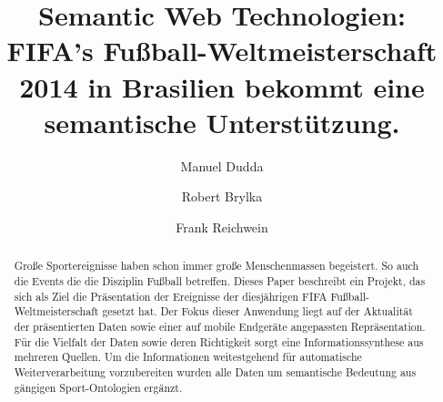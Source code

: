 \documentclass[runningheads,a4paper]{llncs}
\begin{document}
\mainmatter  %

\title{Semantic Web Technologien:\\FIFA's Fu\ss ball-Weltmeisterschaft 2014 in Brasilien bekommt eine semantische Unterst\"utzung.}


%
%
\author{Manuel Dudda \and Robert Brylka\and Frank Reichwein}
%


%
%

\maketitle


\begin{abstract}
Große Sportereignisse haben schon immer große Menschenmassen begeistert. So auch die Events die die Disziplin Fußball betreffen. Dieses Paper beschreibt ein Projekt, das sich als Ziel die Präsentation der Ereignisse der diesjährigen FIFA Fußball-Weltmeisterschaft gesetzt hat. Der Fokus dieser Anwendung liegt auf der Aktualität der präsentierten Daten sowie einer auf mobile Endgeräte angepassten Repräsentation. Für die Vielfalt der Daten sowie deren Richtigkeit sorgt eine Informationssynthese aus mehreren Quellen. Um die Informationen weitestgehend für automatische Weiterverarbeitung vorzubereiten wurden alle Daten um semantische Bedeutung aus gängigen Sport-Ontologien ergänzt.
\end{abstract}
\end{document}

